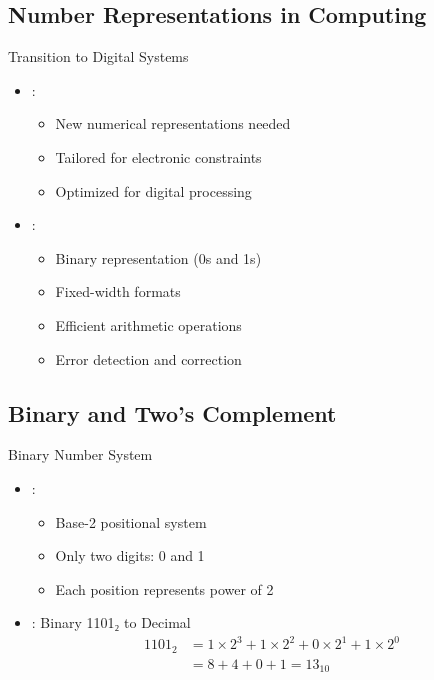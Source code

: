 \subsection{Number Representations in Computing}

\begin{frame}{Transition to Digital Systems}
\begin{itemize}
\item {}:
\begin{itemize}
\item New numerical representations needed
\item Tailored for electronic constraints
\item Optimized for digital processing
\end{itemize}
\vspace{0.5cm}
\item {}:
\begin{itemize}
\item Binary representation (0s and 1s)
\item Fixed-width formats
\item Efficient arithmetic operations
\item Error detection and correction
\end{itemize}
\end{itemize}
\end{frame}

\subsection{Binary and Two's Complement}

\begin{frame}{Binary Number System}
\begin{itemize}
\item {}:
\begin{itemize}
\item Base-2 positional system
\item Only two digits: 0 and 1
\item Each position represents power of 2
\end{itemize}
\vspace{0.5cm}
\item {}: Binary 1101₂ to Decimal
\begin{align}
1101_2 &= 1 \times 2^3 + 1 \times 2^2 + 0 \times 2^1 + 1 \times 2^0\\
&= 8 + 4 + 0 + 1 = 13_{10}
\end{align}
\end{itemize}
\end{frame}

